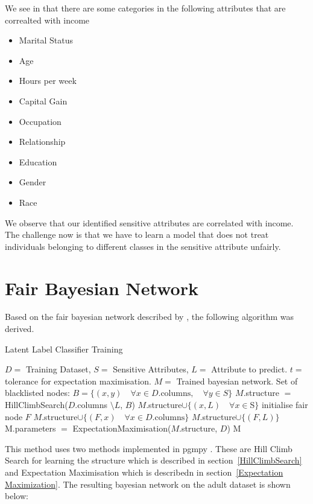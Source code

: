 We see  in that there are some categories in the following attributes that are correalted with income

\begin{itemize}
    \item Marital Status
    \item Age
    \item Hours per week
    \item Capital Gain
    \item Occupation
    \item Relationship
    \item Education
    \item Gender
    \item Race
\end{itemize}

We observe that our identified sensitive attributes are correlated with income. The challenge now is that we have to learn a model that does not treat individuals belonging to different classes in the sensitive attribute unfairly.

\section{Fair Bayesian Network}

Based on the fair bayesian network described by \citet{Choi:2021:AIII}, the following algorithm was derived.

\begin{algorithm}
    \caption{Latent Label Classifier Training}
    \begin{algorithmic}
        \REQUIRE $D = $ Training Dataset, $S = $ Sensitive Attributes, $L = $ Attribute to predict. $t = $ tolerance for expectation maximisation.
        \ENSURE $M = $ Trained bayesian network.
        \STATE Set of blacklisted nodes: $B = \{(x, y) \quad \forall x \in D.\text{columns}, \quad \forall y \in S\}$
        \STATE $M$.structure $=$ HillClimbSearch($D.$columns $\setminus L$, $B$)
        \STATE $M.$structure$ \cup \{ (x, L) \quad \forall x \in $S$\}$
        \STATE initialise fair node $F$
        \STATE $M.$structure$ \cup \{ (F, x) \quad \forall x \in D.\text{columns}\}$
        \STATE $M.$structure$ \cup \{ (F, L)\}$
        \STATE M.parameters $=$ ExpectationMaximisation($M$.structure, $D$)
        \RETURN M 
    \end{algorithmic}
\end{algorithm}

This method uses two methods implemented in pgmpy \cite{Ankan:2015:SCIPY}. These are Hill Climb Search for learning the structure which is described in section~\ref{HillClimbSearch} and Expectation Maximisation which is describedn in section~\ref{Expectation Maximization}. The resulting bayesian network on the adult dataset is shown below:

